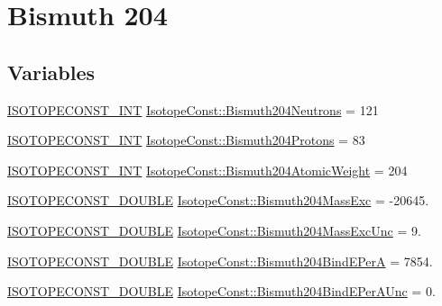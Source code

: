 \hypertarget{group___isotope_const-_bismuth-_bi204}{}\section{Bismuth 204}
\label{group___isotope_const-_bismuth-_bi204}
\subsection*{Variables}
\begin{DoxyCompactItemize}
\item 
\mbox{\hyperlink{group___isotope_const-_macros_ga5f18360b3e99483a35c32d789e62621c}{I\+S\+O\+T\+O\+P\+E\+C\+O\+N\+S\+T\+\_\+\+I\+NT}} \mbox{\hyperlink{group___isotope_const-_bismuth-_bi204_gae39d64a2a072640318040183e3199823}{Isotope\+Const\+::\+Bismuth204\+Neutrons}} = 121
\item 
\mbox{\hyperlink{group___isotope_const-_macros_ga5f18360b3e99483a35c32d789e62621c}{I\+S\+O\+T\+O\+P\+E\+C\+O\+N\+S\+T\+\_\+\+I\+NT}} \mbox{\hyperlink{group___isotope_const-_bismuth-_bi204_ga0a4d216dcfe088b589a454cf336d1ed2}{Isotope\+Const\+::\+Bismuth204\+Protons}} = 83
\item 
\mbox{\hyperlink{group___isotope_const-_macros_ga5f18360b3e99483a35c32d789e62621c}{I\+S\+O\+T\+O\+P\+E\+C\+O\+N\+S\+T\+\_\+\+I\+NT}} \mbox{\hyperlink{group___isotope_const-_bismuth-_bi204_ga3bc8106ca857e6fe36602bb5661df2bf}{Isotope\+Const\+::\+Bismuth204\+Atomic\+Weight}} = 204
\item 
\mbox{\hyperlink{group___isotope_const-_macros_ga8f45a7272ce02c0b4c65c44636ed719a}{I\+S\+O\+T\+O\+P\+E\+C\+O\+N\+S\+T\+\_\+\+D\+O\+U\+B\+LE}} \mbox{\hyperlink{group___isotope_const-_bismuth-_bi204_gaed3a92d571b224f9a07a937c7caf36c3}{Isotope\+Const\+::\+Bismuth204\+Mass\+Exc}} = -\/20645.
\item 
\mbox{\hyperlink{group___isotope_const-_macros_ga8f45a7272ce02c0b4c65c44636ed719a}{I\+S\+O\+T\+O\+P\+E\+C\+O\+N\+S\+T\+\_\+\+D\+O\+U\+B\+LE}} \mbox{\hyperlink{group___isotope_const-_bismuth-_bi204_ga2ac5de5134d9f8c9a78eeec13869d778}{Isotope\+Const\+::\+Bismuth204\+Mass\+Exc\+Unc}} = 9.
\item 
\mbox{\hyperlink{group___isotope_const-_macros_ga8f45a7272ce02c0b4c65c44636ed719a}{I\+S\+O\+T\+O\+P\+E\+C\+O\+N\+S\+T\+\_\+\+D\+O\+U\+B\+LE}} \mbox{\hyperlink{group___isotope_const-_bismuth-_bi204_ga3e73ecb02b6dbdba60faa6b0eb3248a8}{Isotope\+Const\+::\+Bismuth204\+Bind\+E\+PerA}} = 7854.
\item 
\mbox{\hyperlink{group___isotope_const-_macros_ga8f45a7272ce02c0b4c65c44636ed719a}{I\+S\+O\+T\+O\+P\+E\+C\+O\+N\+S\+T\+\_\+\+D\+O\+U\+B\+LE}} \mbox{\hyperlink{group___isotope_const-_bismuth-_bi204_ga74cc5af432a32cc2e8946a120cce8054}{Isotope\+Const\+::\+Bismuth204\+Bind\+E\+Per\+A\+Unc}} = 0.

\end{DoxyCompactItemize}
